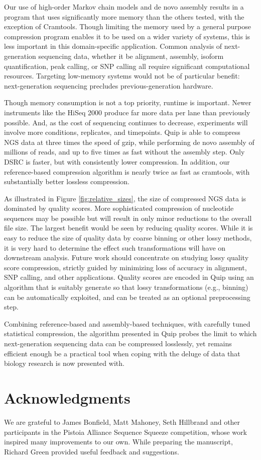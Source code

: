 \documentclass[a4,center,fleqn]{NAR}
\begin{document}
Our use of high-order Markov chain models and de novo assembly results in a
program that uses significantly more memory than the others tested, with the
exception of Cramtools. Though limiting the memory used by a general purpose
compression program enables it to be used on a wider variety of systems, this
is less important in this domain-specific application. Common analysis of
next-generation sequencing data, whether it be alignment, assembly, isoform
quantification, peak calling, or SNP calling all require significant
computational resources. Targeting low-memory systems would not be of
particular benefit: next-generation sequencing precludes previous-generation
hardware.

Though memory consumption is not a top priority, runtime is important. Newer
instruments like the HiSeq 2000 produce far more data per lane than previously
possible. And, as the cost of sequencing continues to decrease, experiments
will involve more conditions, replicates, and timepoints.  Quip is able to
compress NGS data at three times the speed of gzip, while performing de novo
assembly of millions of reads, and up to five times as fast without the
assembly step. Only DSRC is faster, but with consistently lower compression.
In addition, our reference-based compression algorithm is nearly twice as fast
as cramtools, with substantially better lossless compression.

As illustrated in Figure \ref{fig:relative_sizes}, the size of compressed NGS
data is dominated by quality scores. More sophisticated compression of
nucleotide sequences may be possible but will result in only minor reductions
to the overall file size. The largest benefit would be seen by reducing
quality scores. While it is easy to reduce the size of quality data by coarse
binning or other lossy methods, it is very hard to determine the effect such
transformations will have on downstream analysis. Future work should
concentrate on studying lossy quality score compression, strictly guided by
minimizing loss of accuracy in alignment, SNP calling, and other applications.
Quality scores are encoded in Quip using an algorithm that is suitably
generate so that lossy transformations (e.g., binning) can be automatically
exploited, and can be treated as an optional preprocessing step.

Combining reference-based and assembly-based techniques, with carefully tuned
statistical compression, the algorithm presented in Quip probes the limit to
which next-generation sequencing data can be compressed losslessly, yet
remains efficient enough be a practical tool when coping with the deluge of
data that biology research is now presented with.

\section{Acknowledgments}

We are grateful to James Bonfield, Matt Mahoney, Seth Hillbrand and other
participants in the Pistoia Alliance Sequence Squeeze competition, whose work
inspired many improvements to our own. While preparing the manuscript, Richard
Green provided useful feedback and suggestions.



\end{document}
